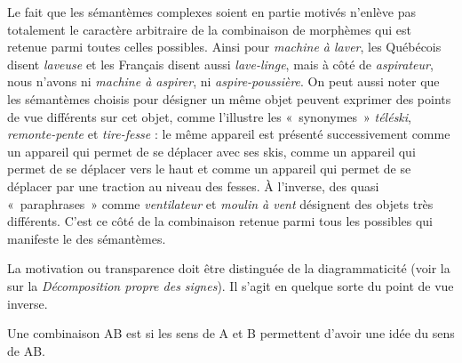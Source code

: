 Le fait que les sémantèmes complexes soient en partie motivés n’enlève pas totalement le caractère arbitraire de la combinaison de morphèmes qui est retenue parmi toutes celles possibles. Ainsi pour \textit{machine à laver}, les Québécois disent \textit{laveuse} et les Français disent aussi \textit{lave-linge}, mais à côté de \textit{aspirateur}, nous n’avons ni \textit{machine à aspirer}, ni \textit{aspire-poussière}. On peut aussi noter que les sémantèmes choisis pour désigner un même objet peuvent exprimer des points de vue différents sur cet objet, comme l’illustre les «~synonymes~» \textit{téléski}, \textit{remonte-pente} et \textit{tire-fesse} : le même appareil est présenté successivement comme un appareil qui permet de se déplacer avec ses skis, comme un appareil qui permet de se déplacer vers le haut et comme un appareil qui permet de se déplacer par une traction au niveau des fesses. À l’inverse, des quasi «~paraphrases~» comme \textit{ventilateur} et \textit{moulin à vent} désignent des objets très différents. C’est ce côté  de la combinaison retenue parmi tous les possibles qui manifeste le  des sémantèmes.

La motivation ou transparence doit être distinguée de la diagrammaticité (voir la  sur la \textit{Décomposition propre des signes}). Il s’agit en quelque sorte du point de vue inverse.

{Une combinaison AB est  si les sens de A et B permettent d’avoir une idée du sens de AB.}

